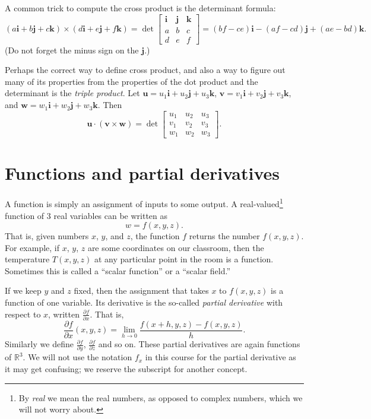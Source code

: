 \documentclass[12pt]{article}
\newcommand{\R}{{\mathbb{R}}}
\newcommand{\veci}{\mathbf{i}}
\newcommand{\vecj}{\mathbf{j}}
\newcommand{\veck}{\mathbf{k}}
\begin{document}
A common trick to compute the cross product
is the determinant formula:
\[
(a \veci + b \vecj + c \veck ) \times 
(d \veci + e \vecj + f \veck ) =
\det
\begin{bmatrix}
\veci & \vecj & \veck \\
a & b & c \\
d & e & f
\end{bmatrix}
=
(bf-ce) \veci -
(af-cd) \vecj +
(ae-bd) \veck .
\]
(Do not forget the minus sign on the $\vecj$.)

Perhaps the correct way to define cross product,
and also a way to figure out many of its properties from
the properties of the dot product and
the determinant is the \emph{triple product}.
Let $\mathbf{u} = u_1 \veci + u_2 \vecj + u_3 \veck$,
$\mathbf{v} = v_1 \veci + v_2 \vecj + v_3 \veck$, and
$\mathbf{w} = w_1 \veci + w_2 \vecj + w_3 \veck$.  Then
\[
\mathbf{u} \cdot ( \mathbf{v} \times \mathbf{w} )
=
\det
\begin{bmatrix}
u_1 & u_2 & u_3 \\
v_1 & v_2 & v_3 \\
w_1 & w_2 & w_3
\end{bmatrix} .
\]


\section{Functions and partial derivatives}

A function is simply an assignment of inputs to some output.
A real-valued\footnote{By \emph{real} we mean the real numbers,
as opposed to complex numbers, which we will not worry about.}
function of 3 real variables can be written as
\[
w = f(x,y,z) .
\]
That is, given numbers $x$, $y$, and $z$, the function $f$ returns the number $f(x,y,z)$.
For example, if $x$, $y$, $z$ are some coordinates on our classroom,
then the temperature $T(x,y,z)$ at any particular point in the room
is a function.  Sometimes this is called a
``scalar function'' or a ``scalar field.''

If we keep $y$ and $z$ fixed, then the assignment that takes $x$ to $f(x,y,z)$ is a
function of one variable.
Its derivative is the so-called \emph{partial derivative} with respect to $x$,
written $\frac{\partial f}{\partial x}$.  That is,
\[
\frac{\partial f}{\partial x}(x,y,z) =
\lim_{h\to 0} \frac{f(x+h,y,z)-f(x,y,z)}{h} .
\]
Similarly we define
$\frac{\partial f}{\partial y}$,
$\frac{\partial f}{\partial z}$ and so on.  These partial derivatives are again
functions of $\R^3$.
We will not use the notation $f_x$ in this
course for the partial derivative as
it may get confusing;
we reserve the subscript for another concept.
\end{document}
